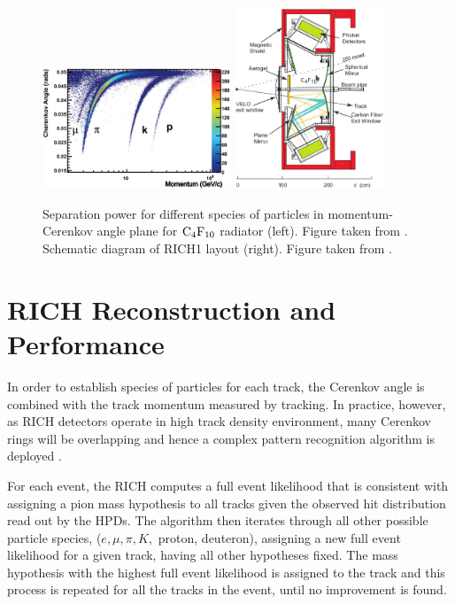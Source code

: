 \begin{figure}[!h]
	\centering
	\includegraphics[width = 0.5\textwidth]{figs/detector/CKAnglevsMom_NoTheory_jun2011-01.eps}%
	\includegraphics[width = 0.4\textwidth]{figs/detector/mechrich.eps}%
	\caption{Separation power for different species of particles in momentum-Cerenkov angle plane for $\rm{C_{4}F_{10}}$ radiator (left). Figure taken from \cite{LHCb-DP-2012-003}.  Schematic diagram of \gls{RICH1} layout (right). Figure taken from \cite{det_paper}.}
	\label{fig:richres}
\end{figure}

\section{RICH Reconstruction and Performance }
In order to establish species of particles for each track, the Cerenkov angle is combined with the track momentum measured by tracking. In practice, however, as \Gls{RICH} detectors operate in high track density environment, many Cerenkov rings will be overlapping and hence a complex pattern recognition algorithm is deployed \cite{Forty:1999sg}. 


For each event, the \Gls{RICH} computes a full event likelihood that is consistent with assigning a pion mass hypothesis to all tracks given the observed hit distribution read out by the \Gls{HPD}s. The algorithm then iterates through all other possible particle species, ($e, \mu, \pi, K,$ proton, deuteron), assigning a new full event likelihood for a given track, having all other hypotheses fixed. The mass hypothesis with the highest full event likelihood is assigned to the track and this process is repeated for all the tracks in the event, until no improvement is found. 


